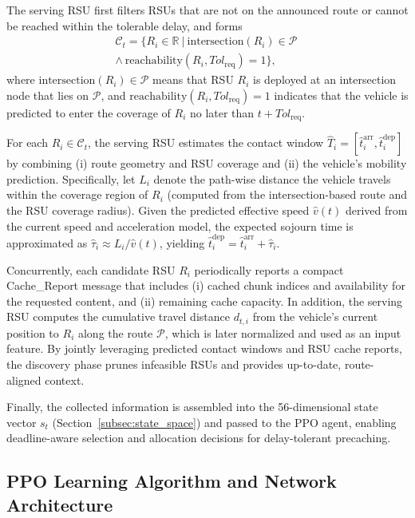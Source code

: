 The serving RSU first filters RSUs that are not on the announced route or cannot be reached within the tolerable delay, and forms
\begin{equation}
\begin{split}
\mathcal{C}_t=\Big\{R_i\in\mathbb{R}\ \Big|\ \text{intersection}(R_i)\in\mathcal{P}\ \\ \wedge\ \text{reachability}(R_i,Tol_{\text{req}})=1\Big\},
\end{split}
\end{equation}
where $\text{intersection}(R_i)\in\mathcal{P}$ means that RSU $R_i$ is deployed at an intersection node that lies on $\mathcal{P}$, and
$\text{reachability}(R_i,Tol_{\text{req}})=1$ indicates that the vehicle is predicted to enter the coverage of $R_i$ no later than $t+Tol_{\text{req}}$.

For each $R_i\in\mathcal{C}_t$, the serving RSU estimates the contact window
$\hat{T}_i=[\hat{t}^{\text{arr}}_i,\hat{t}^{\text{dep}}_i]$ by combining (i) route geometry and RSU coverage and (ii) the vehicle’s mobility prediction.
Specifically, let $L_i$ denote the path-wise distance the vehicle travels within the coverage region of $R_i$ (computed from the intersection-based route and the RSU coverage radius). 
Given the predicted effective speed $\hat{v}(t)$ derived from the current speed and acceleration model, the expected sojourn time is approximated as $\hat{\tau}_i \approx L_i/\hat{v}(t)$, yielding $\hat{t}^{\text{dep}}_i=\hat{t}^{\text{arr}}_i+\hat{\tau}_i$.

Concurrently, each candidate RSU $R_i$ periodically reports a compact \textsf{Cache\_Report} message that includes (i) cached chunk indices and availability for the requested content, and (ii) remaining cache capacity. 
In addition, the serving RSU computes the cumulative travel distance $d_{t,i}$ from the vehicle’s current position to $R_i$ along the route $\mathcal{P}$, which is later normalized and used as an input feature. 
By jointly leveraging predicted contact windows and RSU cache reports, the discovery phase prunes infeasible RSUs and provides up-to-date, route-aligned context.

Finally, the collected information is assembled into the 56-dimensional state vector $s_t$ (Section~\ref{subsec:state_space}) and passed to the PPO agent, enabling deadline-aware selection and allocation decisions for delay-tolerant precaching.

\subsection{PPO Learning Algorithm and Network Architecture} 

